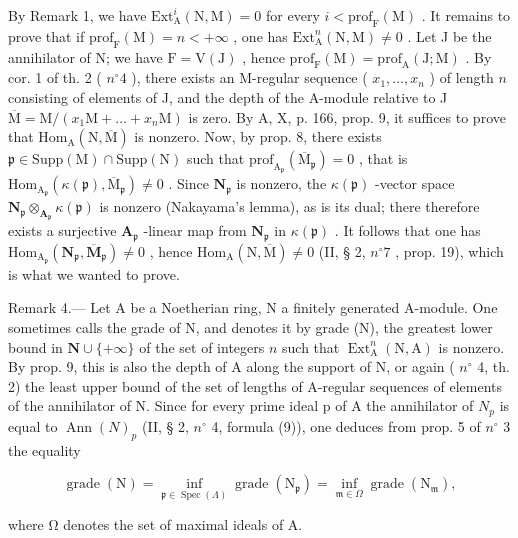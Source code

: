 By Remark 1, we have \(\mathrm{Ext}_{\mathrm{A}}^{i}(\mathrm{N},\mathrm{M}) = 0\) for every \(i < \mathrm{prof}_{\mathrm{F}}(\mathrm{M})\) . It remains to prove that if \(\mathrm{prof}_{\mathrm{F}}(\mathrm{M}) = n < +\infty\) , one has \(\mathrm{Ext}_{\mathrm{A}}^{n}(\mathrm{N},\mathrm{M}) \neq 0\) . Let J be the annihilator of N; we have \(\mathrm{F} = \mathrm{V}(\mathrm{J})\) , hence \(\mathrm{prof}_{\mathrm{F}}(\mathrm{M}) = \mathrm{prof}_{\mathrm{A}}(\mathrm{J};\mathrm{M})\) . By cor. 1 of th. 2 ( \(n^{\circ}4\) ), there exists an M-regular sequence ( \(x_{1},\ldots,x_{n}\) ) of length \(n\) consisting of elements of J, and the depth of the A-module relative to J \(\overline{\mathrm{M}} = \mathrm{M}/(x_{1}\mathrm{M}+\ldots+x_{n}\mathrm{M})\) is zero. By A, X, p. 166, prop. 9, it suffices to prove that \(\mathrm{Hom}_{\mathrm{A}}(\mathrm{N},\overline{\mathrm{M}})\) is nonzero. Now, by prop. 8, there exists \(\mathfrak{p} \in \mathrm{Supp}(\mathrm{M}) \cap \mathrm{Supp}(\mathrm{N})\) such that \(\mathrm{prof}_{\mathrm{A}_{\mathfrak{p}}}(\overline{\mathrm{M}}_{\mathfrak{p}}) = 0\) , that is \(\mathrm{Hom}_{\mathrm{A}_{\mathfrak{p}}}(\kappa(\mathfrak{p}),\overline{\mathrm{M}}_{\mathfrak{p}}) \neq 0\) . Since \(\mathbf{N}_{\mathfrak{p}}\) is nonzero, the \(\kappa(\mathfrak{p})\) -vector space \(\mathbf{N}_{\mathfrak{p}} \otimes_{\mathbf{A}_{\mathfrak{p}}} \kappa(\mathfrak{p})\) is nonzero (Nakayama's lemma), as is its dual; there therefore exists a surjective \(\mathbf{A}_{\mathfrak{p}}\) -linear map from \(\mathbf{N}_{\mathfrak{p}}\) in \(\kappa(\mathfrak{p})\) . It follows that one has \(\mathrm{Hom}_{\mathrm{A}_{\mathfrak{p}}}(\mathbf{N}_{\mathfrak{p}},\overline{\mathbf{M}}_{\mathfrak{p}}) \neq 0\) , hence \(\mathrm{Hom}_{\mathrm{A}}(\mathrm{N},\overline{\mathrm{M}}) \neq 0\) (II, § 2, \(n^{\circ}7\) , prop. 19), which is what we wanted to prove.

Remark 4.--- Let A be a Noetherian ring, N a finitely generated A-module. One sometimes calls the grade of N, and denotes it by grade (N), the greatest lower bound in \(\mathbf{N}\cup\{+\infty\}\) of the set of integers \(n\) such that \(\operatorname{Ext}_{\mathrm{A}}^{n}(\mathrm{N},\mathrm{A})\) is nonzero. By prop. 9, this is also the depth of A along the support of N, or again ( \(n^{\circ}\) 4, th. 2) the least upper bound of the set of lengths of A-regular sequences of elements of the annihilator of N. Since for every prime ideal p of A the annihilator of \(N_{p}\) is equal to \(\operatorname{Ann}(N)_{p}\) (II, § 2, \(n^{\circ}\) 4, formula (9)), one deduces from prop. 5 of \(n^{\circ}\) 3 the equality

\[
\operatorname{grade} (\mathrm{N}) = \inf _ {\mathfrak {p} \in \operatorname{Spec} (\Lambda)} \operatorname{grade} \left(\mathrm{N} _ {\mathfrak {p}}\right) = \inf _ {\mathfrak {m} \in \Omega} \operatorname{grade} \left(\mathrm{N} _ {\mathfrak {m}}\right),
\]

where Ω denotes the set of maximal ideals of A.

